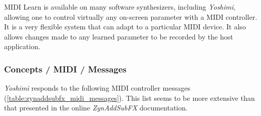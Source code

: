    MIDI Learn is available on many software synthesizers, including
   \textsl{Yoshimi}, allowing one to control virtually any on-screen parameter
   with a MIDI controller. It is a very flexible system that can adapt to a
   particular MIDI device.  It also allows changes made to any learned
   parameter to be recorded by the host application.

\subsubsection{Concepts / MIDI / Messages}
\label{subsubsec:concepts_midi_messages}

   \textsl{Yoshimi} responds to the following MIDI controller messages
   (\ref{table:zynaddsubfx_midi_messages}).
   This list seems to be more extensive than that presented in the
   online \textsl{ZynAddSubFX} documentation.

